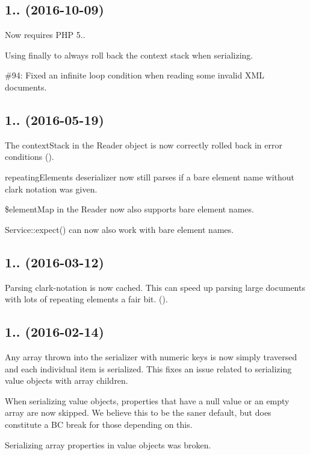 \subsection*{1.. (2016-\/10-\/09) }


\begin{DoxyItemize}
\item Now requires P\+HP 5..
\item Using {\ttfamily finally} to always roll back the context stack when serializing.
\item \#94\+: Fixed an infinite loop condition when reading some invalid X\+ML documents.
\end{DoxyItemize}

\subsection*{1.. (2016-\/05-\/19) }


\begin{DoxyItemize}
\item The {\ttfamily context\+Stack} in the Reader object is now correctly rolled back in error conditions ().
\item repeating\+Elements deserializer now still parses if a bare element name without clark notation was given.
\item {\ttfamily \$element\+Map} in the Reader now also supports bare element names.
\item {\ttfamily Service\+::expect()} can now also work with bare element names.
\end{DoxyItemize}

\subsection*{1.. (2016-\/03-\/12) }


\begin{DoxyItemize}
\item Parsing clark-\/notation is now cached. This can speed up parsing large documents with lots of repeating elements a fair bit. ().
\end{DoxyItemize}

\subsection*{1.. (2016-\/02-\/14) }


\begin{DoxyItemize}
\item Any array thrown into the serializer with numeric keys is now simply traversed and each individual item is serialized. This fixes an issue related to serializing value objects with array children.
\item When serializing value objects, properties that have a null value or an empty array are now skipped. We believe this to be the saner default, but does constitute a BC break for those depending on this.
\item Serializing array properties in value objects was broken.
\end{DoxyItemize}

